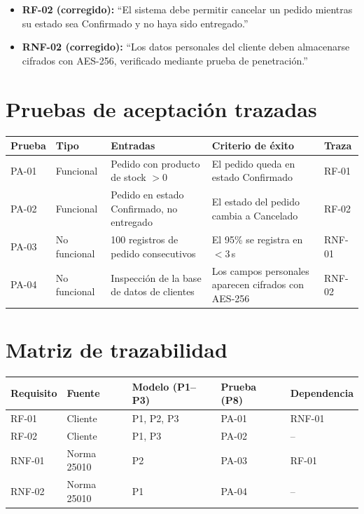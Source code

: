 \documentclass[11pt,a4paper]{article}
\begin{document}
\begin{itemize}[nosep]
    \item \textbf{RF-02 (corregido):} ``El sistema debe permitir cancelar un pedido mientras su estado sea Confirmado y no haya sido entregado.''
    \item \textbf{RNF-02 (corregido):} ``Los datos personales del cliente deben almacenarse cifrados con AES-256, verificado mediante prueba de penetraci\'on.''
\end{itemize}


\section{Pruebas de aceptaci\'on trazadas}

\begin{table}[h]
\centering
\small
\begin{tabular}{lp{1.6cm}p{4.2cm}p{4.5cm}p{1.3cm}}
\toprule
\textbf{Prueba} & \textbf{Tipo} & \textbf{Entradas} & \textbf{Criterio de \'exito} & \textbf{Traza} \\
\midrule
PA-01 & Funcional & Pedido con producto de stock $>0$ & El pedido queda en estado Confirmado & RF-01 \\
PA-02 & Funcional & Pedido en estado Confirmado, no entregado & El estado del pedido cambia a Cancelado & RF-02 \\
PA-03 & No funcional & 100 registros de pedido consecutivos & El 95\% se registra en $<3$\,s & RNF-01 \\
PA-04 & No funcional & Inspecci\'on de la base de datos de clientes & Los campos personales aparecen cifrados con AES-256 & RNF-02 \\
\bottomrule
\end{tabular}

\end{table}

\section{Matriz de trazabilidad}

\begin{table}[h]
\centering
\small
\begin{tabular}{lllll}
\toprule
\textbf{Requisito} & \textbf{Fuente} & \textbf{Modelo (P1--P3)} & \textbf{Prueba (P8)} & \textbf{Dependencia} \\
\midrule
RF-01 & Cliente & P1, P2, P3 & PA-01 & RNF-01 \\
RF-02 & Cliente & P1, P3 & PA-02 & -- \\
RNF-01 & Norma 25010 & P2 & PA-03 & RF-01 \\
RNF-02 & Norma 25010 & P1 & PA-04 & -- \\
\bottomrule
\end{tabular}
\end{table}
\end{document}

